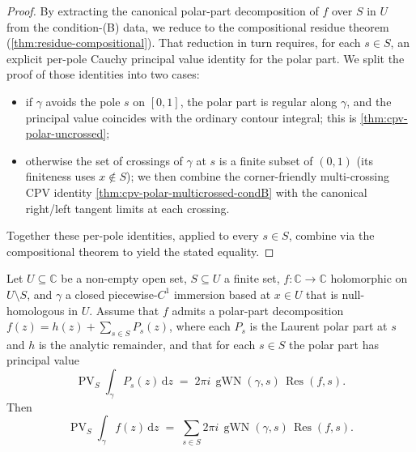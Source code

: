 \begin{proof}
  \leanok
  By extracting the canonical polar-part decomposition of $f$ over
  $S$ in $U$ from the condition-(B) data, we reduce to the
  compositional residue theorem (\cref{thm:residue-compositional}).
  That reduction in turn requires, for each $s \in S$, an explicit
  per-pole Cauchy principal value identity for the polar part. We
  split the proof of those identities into two cases:
  \begin{itemize}
    \item if $\gamma$ avoids the pole $s$ on $[0,1]$, the polar part
      is regular along $\gamma$, and the principal value coincides
      with the ordinary contour integral; this is
      \cref{thm:cpv-polar-uncrossed};
    \item otherwise the set of crossings of $\gamma$ at $s$ is a
      finite subset of $(0,1)$ (its finiteness uses
      $x \notin S$); we then combine the corner-friendly
      multi-crossing CPV identity \cref{thm:cpv-polar-multicrossed-condB}
      with the canonical right/left tangent limits at each crossing.
  \end{itemize}
  Together these per-pole identities, applied to every $s \in S$,
  combine via the compositional theorem to yield the stated
  equality.
\end{proof}

\begin{theorem}
  \label{thm:residue-compositional}
  \leanok
  Let $U \subseteq \mathbb{C}$ be a non-empty open set,
  $S \subseteq U$ a finite set, $f : \mathbb{C} \to \mathbb{C}$
  holomorphic on $U \setminus S$, and $\gamma$ a closed piecewise-$C^{1}$
  immersion based at $x \in U$ that is null-homologous in $U$. Assume
  that $f$ admits a polar-part decomposition
  $f(z) = h(z) + \sum_{s \in S} P_s(z)$, where each $P_s$ is the
  Laurent polar part at $s$ and $h$ is the analytic remainder, and
  that for each $s \in S$ the polar part has principal value
  \[
    \operatorname{PV}_S\!\!\int_\gamma P_s(z)\,\mathrm{d}z
      \;=\; 2 \pi i \, \operatorname{gWN}(\gamma, s) \,
        \operatorname{Res}(f, s).
  \]
  Then
  \[
    \operatorname{PV}_S\!\!\int_\gamma f(z)\,\mathrm{d}z
    \;=\; \sum_{s \in S}
      2 \pi i \, \operatorname{gWN}(\gamma, s) \,
        \operatorname{Res}(f, s).
  \]
\end{theorem}

